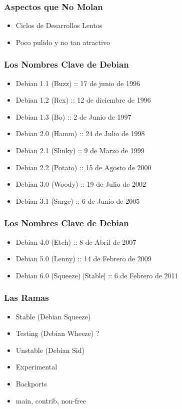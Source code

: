 \documentclass{beamer}
\begin{document}
\begin{frame}
  \frametitle {Aspectos que No Molan}
  \begin{itemize}
    \item Ciclos de Desarrollos Lentos
    \item Poco pulido y no tan atractivo
  \end{itemize}
\end{frame}

\begin{frame}
  \frametitle {Los Nombres Clave de Debian}
  \begin{itemize}
    \item Debian 1.1 (Buzz) :: 17 de junio de 1996
    \item Debian 1.2 (Rex) :: 12 de diciembre de 1996
    \item Debian 1.3 (Bo) :: 2 de Junio de 1997
    \item Debian 2.0 (Hamm) :: 24 de Julio de 1998
    \item Debian 2.1 (Slinky) :: 9 de Marzo de 1999
    \item Debian 2.2 (Potato) :: 15 de Agosto de 2000
    \item Debian 3.0 (Woody) :: 19 de Julio de 2002
    \item Debian 3.1 (Sarge) :: 6 de Junio de 2005
  \end{itemize}
\end{frame}

\begin{frame}
  \frametitle {Los Nombres Clave de Debian}
  \begin{itemize}
    \item Debian 4.0 (Etch) ::  8 de Abril de 2007
    \item Debian 5.0 (Lenny) :: 14 de Febrero de 2009
    \pause
    \item Debian 6.0 (Squeeze) [Stable] :: 6 de Febrero de 2011
  \end{itemize}
\end{frame}

\begin{frame}
  \frametitle {Las Ramas}
  \begin{itemize}
    \item Stable (Debian Squeeze)
    \item Testing (Debian Wheeze) ?
    \item Unstable (Debian Sid)
    \item Experimental
    \item Backports
    \pause
    \item main, contrib, non-free
  \end{itemize}
\end{frame}
\end{document}
